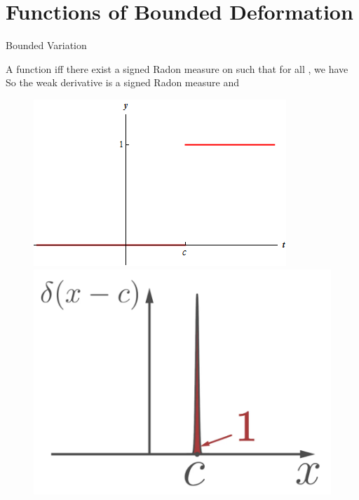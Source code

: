\documentclass{beamer}
\begin{document}
\section{Functions of Bounded Deformation}
\begin{frame}{Bounded Variation}
        \begin{definition} A function  iff there exist a signed Radon measure \vl{$\mu$} on \vl{$\Omega$}  such that for all , we have
        So the weak derivative is a signed Radon measure and 
        \end{definition}
        \pause
        \begin{center}
        \begin{figure}
            \begin{minipage}[b!]{0.48\textwidth}
                \includegraphics[scale=0.4]{figures/heavyside.png}
            \end{minipage}
            \pause
            \begin{minipage}[b!]{0.48\textwidth}
                \vspace{0.32cm}
                \includegraphics[scale=0.3]{figures/delta.png}
            \end{minipage}
            \end{figure}
        \end{center}
    \end{frame}
\end{document}
